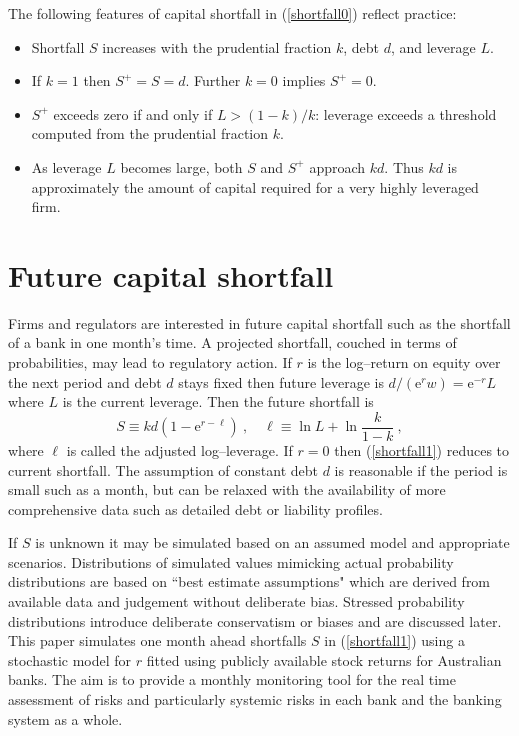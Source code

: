 \documentclass[authoryear]{elsarticle}
\newcommand{\e}{\mathrm{e}}
\newcommand{\cq}{\ ,\quad }
\newcommand{\eref}[1]{(\ref{#1})}
\newcommand{\bi}{\begin{itemize}}
\renewcommand{\i}{\item}
\newcommand{\ei}{\end{itemize}}
\begin{document}
The following features of capital shortfall in \eref{shortfall0} reflect practice:
\bi

\i Shortfall $S$ increases with the prudential fraction $k$, debt $d$, and leverage $L$.


\i If  $k=1$ then $S^+=S=d$.  Further $k=0$ implies $S^+=0$.


\i $S^+$ exceeds zero if and only if $L>(1-k)/k$: leverage exceeds a threshold computed from the prudential fraction $k$.


\i As  leverage $L$ becomes large,  both $S$ and $S^+$ approach $k d$. Thus $kd$ is approximately the amount of capital required for a very highly leveraged firm.

\ei

\section{Future capital shortfall}\label{s_expshort}

Firms and regulators are interested in future capital shortfall such as the shortfall of a bank in one month's time.   A projected shortfall, couched in terms of  probabilities, may lead to regulatory action.  If $r$ is the log--return on equity over the next period and debt $d$ stays fixed then  future leverage is $d/(\e^r w)= \e^{-r}L$ where $L$ is the current leverage.  Then the future shortfall is
\begin{equation}\label{shortfall1}
S \equiv k d  (1-\e^{r-\ell})\cq \ell\equiv \ln L + \ln\frac{k}{1-k}   \  ,
\end{equation}
where $\ell$ is called the adjusted log--leverage.   If $r=0$ then \eref{shortfall1} reduces to current shortfall.
The assumption of constant debt $d$ is reasonable if the period is small such as a month, but can be relaxed with the availability of more comprehensive data such as detailed debt or liability profiles.  

If $S$ is unknown it may be simulated based on an assumed model and appropriate scenarios.     Distributions of simulated values mimicking actual probability distributions are based on ``best estimate assumptions" which are derived from available data and judgement without deliberate bias. Stressed probability distributions  introduce deliberate conservatism or biases and are discussed later.
This paper simulates one month ahead shortfalls $S$ in \eref{shortfall1} using  a stochastic model for $r$ fitted using publicly available stock returns for Australian banks.   The aim is to provide a monthly monitoring tool for the real time assessment of risks and particularly systemic risks in each bank and the banking system as a whole. 
\end{document}
